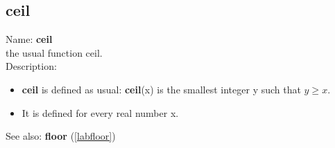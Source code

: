 \subsection{ceil}
\label{labceil}
\noindent Name: \textbf{ceil}\\
the usual function ceil.\\

\noindent Description: \begin{itemize}

\item \textbf{ceil} is defined as usual: \textbf{ceil}(x) is the smallest integer y such that $y \ge x$.

\item It is defined for every real number x.
\end{itemize}
See also: \textbf{floor} (\ref{labfloor})
